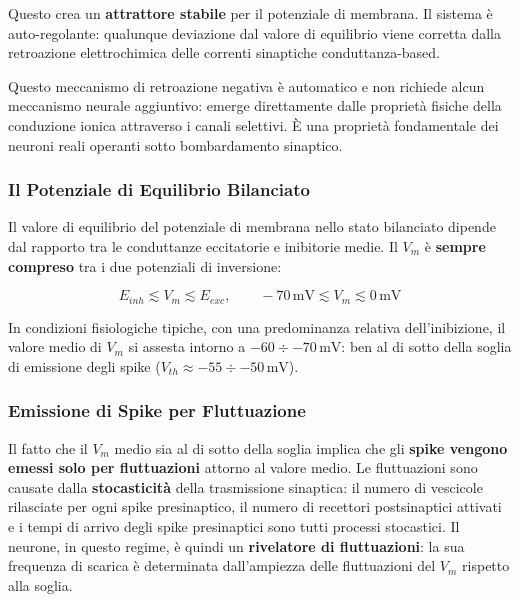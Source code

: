 Questo crea un \textbf{attrattore stabile} per il potenziale di membrana. Il sistema è auto-regolante: qualunque deviazione dal valore di equilibrio viene corretta dalla retroazione elettrochimica delle correnti sinaptiche conduttanza-based.

\begin{tcolorbox}[colback=gray!5, colframe=gray!40, arc=2mm, boxrule=0.5pt]
 Questo meccanismo di retroazione negativa è automatico e non richiede alcun meccanismo neurale aggiuntivo: emerge direttamente dalle proprietà fisiche della conduzione ionica attraverso i canali selettivi. È una proprietà fondamentale dei neuroni reali operanti sotto bombardamento sinaptico.
\end{tcolorbox}

\subsubsection{Il Potenziale di Equilibrio Bilanciato}

Il valore di equilibrio del potenziale di membrana nello stato bilanciato dipende dal rapporto tra le conduttanze eccitatorie e inibitorie medie. Il $V_m$ è \textbf{sempre compreso} tra i due potenziali di inversione:

\begin{equation}
E_{inh} \lesssim V_m \lesssim E_{exc}, \qquad -70 \, \text{mV} \lesssim V_m \lesssim 0 \, \text{mV}
\end{equation}

In condizioni fisiologiche tipiche, con una predominanza relativa dell'inibizione, il valore medio di $V_m$ si assesta intorno a $-60 \div -70 \, \text{mV}$: ben al di sotto della soglia di emissione degli spike ($V_{th} \approx -55 \div -50 \, \text{mV}$).

\subsubsection{Emissione di Spike per Fluttuazione}

Il fatto che il $V_m$ medio sia al di sotto della soglia implica che gli \textbf{spike vengono emessi solo per fluttuazioni} attorno al valore medio. Le fluttuazioni sono causate dalla \textbf{stocasticità} della trasmissione sinaptica: il numero di vescicole rilasciate per ogni spike presinaptico, il numero di recettori postsinaptici attivati e i tempi di arrivo degli spike presinaptici sono tutti processi stocastici. Il neurone, in questo regime, è quindi un \textbf{rivelatore di fluttuazioni}: la sua frequenza di scarica è determinata dall'ampiezza delle fluttuazioni del $V_m$ rispetto alla soglia.

